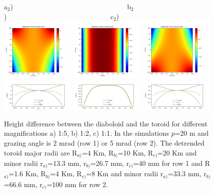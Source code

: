 \documentclass{iucr}              %
\begin{document}
\begin{figure}
\flushleft
a$_2$)~~~~~~~~~~~~~~~~~~~~~~~~~~~~~~~~~b$_2$)~~~~~~~~~~~~~~~~~~~~~~~~~~~~~~c$_2$)\\
\centering
\includegraphics[width=0.32\textwidth]{figures/diaboloid_detrended_5mrad_1:5_image.png} 
\includegraphics[width=0.32\textwidth]{figures/diaboloid_detrended_5mrad_1:2_image.png} 
\includegraphics[width=0.32\textwidth]{figures/diaboloid_detrended_5mrad_1:1_image.png} \\
\includegraphics[width=0.32\textwidth]{figures/diaboloid_detrended_5mrad_1:5_profile.png}
\includegraphics[width=0.32\textwidth]{figures/diaboloid_detrended_5mrad_1:2_profile.png}
\includegraphics[width=0.32\textwidth]{figures/diaboloid_detrended_5mrad_1:1_profile.png}

\caption{
Height difference between the diaboloid and the toroid for different magnifications a) 1:5, b) 1:2, c) 1:1. In the simulations $p$=20 m and grazing angle is 2 mrad (row 1) or 5 mrad (row 2). The detrended toroid major radii are R$_{a)}$=4 Km, R$_{b)}$=10 Km, R$_{c)}$=20 Km and minor radii r$_{a)}$=13.3 mm, r$_{b)}$=26.7 mm, r$_{c)}$=40 mm for row 1 and R$_{a)}$=1.6 Km, R$_{b)}$=4 Km, R$_{c)}$=8 Km and minor radii r$_{a)}$=33.3 mm, r$_{b)}$=66.6 mm, r$_{c)}$=100 mm for row 2.
}
\end{figure}
\end{document}
